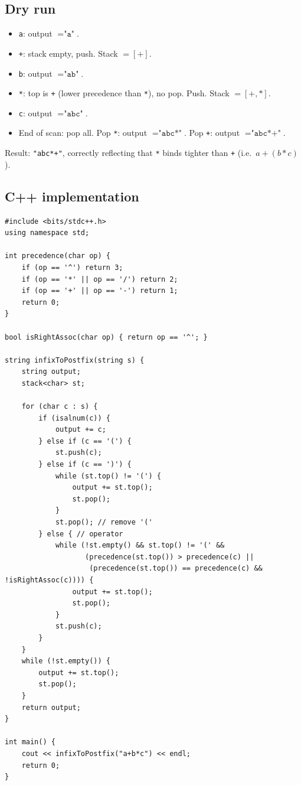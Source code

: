 \subsection*{Dry run}


\begin{itemize}
  \item \texttt{a}: output $=\texttt{"a"}$.
  \item \texttt{+}: stack empty, push. Stack $=[+]$.
  \item \texttt{b}: output $=\texttt{"ab"}$.
  \item \texttt{*}: top is \texttt{+} (lower precedence than \texttt{*}),
        no pop. Push. Stack $=[+,*]$.
  \item \texttt{c}: output $=\texttt{"abc"}$.
  \item End of scan: pop all. Pop \texttt{*}: output
        $=\texttt{"abc*"}$. Pop \texttt{+}: output $=\texttt{"abc*+"}$.
\end{itemize}

Result: \texttt{"abc*+"}, correctly reflecting that \texttt{*} binds
tighter than \texttt{+} (i.e.\ $a+(b*c)$).

\subsection*{C++ implementation}

\begin{lstlisting}
#include <bits/stdc++.h>
using namespace std;

int precedence(char op) {
    if (op == '^') return 3;
    if (op == '*' || op == '/') return 2;
    if (op == '+' || op == '-') return 1;
    return 0;
}

bool isRightAssoc(char op) { return op == '^'; }

string infixToPostfix(string s) {
    string output;
    stack<char> st;

    for (char c : s) {
        if (isalnum(c)) {
            output += c;
        } else if (c == '(') {
            st.push(c);
        } else if (c == ')') {
            while (st.top() != '(') {
                output += st.top();
                st.pop();
            }
            st.pop(); // remove '('
        } else { // operator
            while (!st.empty() && st.top() != '(' &&
                   (precedence(st.top()) > precedence(c) ||
                    (precedence(st.top()) == precedence(c) && !isRightAssoc(c)))) {
                output += st.top();
                st.pop();
            }
            st.push(c);
        }
    }
    while (!st.empty()) {
        output += st.top();
        st.pop();
    }
    return output;
}

int main() {
    cout << infixToPostfix("a+b*c") << endl;
    return 0;
}
\end{lstlisting}

